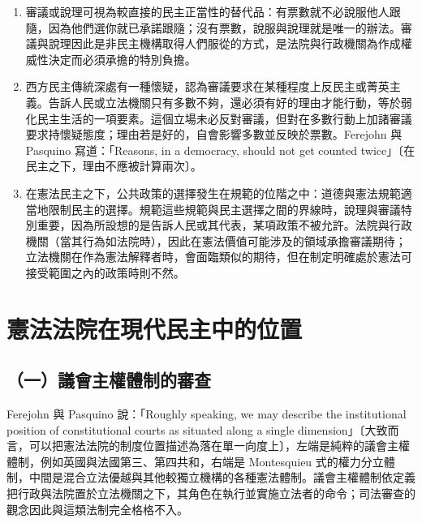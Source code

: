 \begin{enumerate}
\def\labelenumi{\arabic{enumi}.}
\tightlist
\item
  審議或說理可視為較直接的民主正當性的替代品：有票數就不必說服他人跟隨，因為他們選你就已承諾跟隨；沒有票數，說服與說理就是唯一的辦法。審議與說理因此是非民主機構取得人們服從的方式，是法院與行政機關為作成權威性決定而必須承擔的特別負擔。
\item
  西方民主傳統深處有一種懷疑，認為審議要求在某種程度上反民主或菁英主義。告訴人民或立法機關只有多數不夠，還必須有好的理由才能行動，等於弱化民主生活的一項要素。這個立場未必反對審議，但對在多數行動上加諸審議要求持懷疑態度；理由若是好的，自會影響多數並反映於票數。Ferejohn 與 Pasquino 寫道：「Reasons, in a democracy, should not get counted twice」〔在民主之下，理由不應被計算兩次〕。
\item
  在憲法民主之下，公共政策的選擇發生在規範的位階之中：道德與憲法規範適當地限制民主的選擇。規範這些規範與民主選擇之間的界線時，說理與審議特別重要，因為所設想的是告訴人民或其代表，某項政策不被允許。法院與行政機關（當其行為如法院時），因此在憲法價值可能涉及的領域承擔審議期待；立法機關在作為憲法解釋者時，會面臨類似的期待，但在制定明確處於憲法可接受範圍之內的政策時則不然。
\end{enumerate}

\section{憲法法院在現代民主中的位置}
\label{sec:FP-4}

\subsection{（一）議會主權體制的審查}

Ferejohn 與 Pasquino 說：「Roughly speaking, we may describe the institutional position of constitutional courts as situated along a single dimension」〔大致而言，可以把憲法法院的制度位置描述為落在單一向度上〕，左端是純粹的議會主權體制，例如英國與法國第三、第四共和，右端是 Montesquieu 式的權力分立體制，中間是混合立法優越與其他較獨立機構的各種憲法體制。議會主權體制依定義把行政與法院置於立法機關之下，其角色在執行並實施立法者的命令；司法審查的觀念因此與這類法制完全格格不入。

